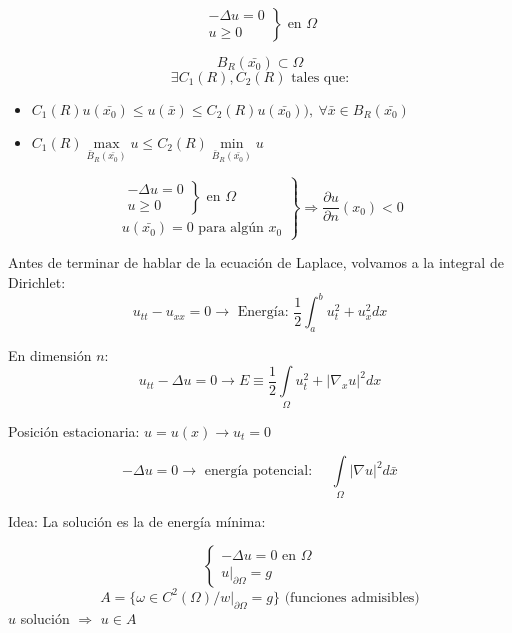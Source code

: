 		\begin{theorem}
			\[ \left. \begin{array}{r}
				-\Delta u = 0  \\
				u \geq 0
			\end{array} \right\} \text{ en } \Omega\]

			\[ B_R(\bar{x_0}) \subset \Omega\]
			\[ \exists C_1(R), C_2(R) \text{ tales que:} \]
			\begin{itemize}
				\item $C_1(R) u(\bar{x_0}) \leq u(\bar{x}) \leq C_2 (R) u(\bar{x_0})), \ \forall \bar{x} \in B_R(\bar{x_0})$
				\item $C_1(R)\max\limits_{\bar{B}_R(\bar{x_0})} u \leq C_2(R) \min\limits_{\bar{B}_R(\bar{x_0})} u $
			\end{itemize}

		\end{theorem}

		\begin{theorem}
			\[ \left. \begin{array}{l} \left. \begin{array}{r}
				-\Delta u = 0  \\
				u \geq 0
			\end{array} \right\} \text{ en } \Omega \\
			u(\bar{x_0}) = 0 \text{ para algún } x_0
			\end{array} \right\} \Rightarrow \frac{\partial u} {\partial n} (x_0) < 0
			\]
		\end{theorem}


		Antes de terminar de hablar de la ecuación de Laplace, volvamos a la integral de Dirichlet:
		\[ u_{tt} - u_{xx} = 0 \rightarrow \text{ Energía: } \frac{1}{2} \int_a^b u_t^2 + u_x^2 dx \]

		En dimensión $n$:
		\[ u_{tt}- \Delta u = 0 \rightarrow E \equiv \frac{1}{2}\int\limits_\Omega u^2_t + | \nabla_x u |^2 dx \]

		Posición estacionaria: $u = u(x) \rightarrow u_t = 0$

		\[ - \Delta u = 0 \rightarrow \text{ energía potencial: }\quad \int\limits_\Omega | \nabla u|^2 d\bar{x} \]

		Idea: La solución es la de energía mínima:

		\[ \begin{cases}
			-\Delta u = 0 \text{ en } \Omega \\
			u|_{\partial\Omega} = g
		\end{cases}\]
		\[ A = \{ \omega \in C^2(\Omega) / w |_{\partial \Omega} = g  \} \text{ (funciones admisibles)}\]
		$u$ solución $\Rightarrow$ $u \in A$

